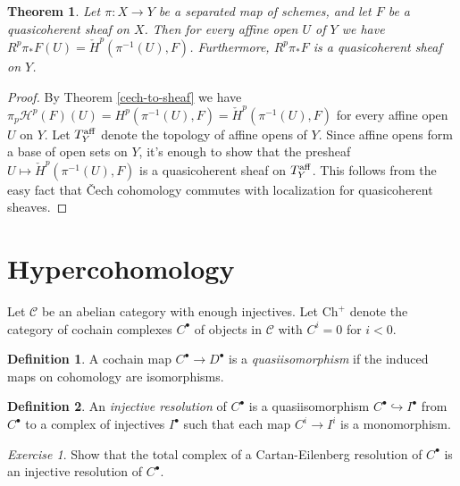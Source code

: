 \documentclass[letterpaper,11pt]{article}
\newtheorem{thm}{Theorem}
\theoremstyle{definition}
\newtheorem{defn}{Definition}
\theoremstyle{remark}
\newtheorem{exer}{Exercise}
\begin{document}
\begin{thm} Let $\pi:X\rightarrow Y$ be a separated map of schemes, and let $F$ be a quasicoherent sheaf on $X$. Then for every affine open $U$ of $Y$ we have $R^p\pi_*F(U) = \check{H}^p(\pi^{-1}(U),F)$. Furthermore, $R^p\pi_*F$ is a quasicoherent sheaf on $Y$.
\end{thm}
\begin{proof} By Theorem \ref{cech-to-sheaf} we have $\pi_p\mathcal{H}^p(F)(U) = H^p(\pi^{-1}(U),F) = \check{H}^p(\pi^{-1}(U),F)$ for every affine open $U$ on $Y$. Let $T_Y^{\rm aff}$ denote the topology of affine opens of $Y$. Since affine opens form a base of open sets on $Y$, it's enough to show that the presheaf $U\mapsto \check{H}^p(\pi^{-1}(U),F)$ is a quasicoherent sheaf on $T_Y^{\rm aff}$. This follows from the easy fact that \v{C}ech cohomology commutes with localization for quasicoherent sheaves.
\end{proof}

\section{Hypercohomology}

Let $\mathcal{C}$ be an abelian category with enough injectives. Let $\mbox{Ch}^+$ denote the category of cochain complexes $C^\bullet$ of objects in $\mathcal{C}$ with $C^i = 0$ for $i < 0$.

\begin{defn} A cochain map $C^\bullet \rightarrow D^\bullet$ is a \emph{quasiisomorphism} if the induced maps on cohomology are isomorphisms.
\end{defn}

\begin{defn} An \emph{injective resolution} of $C^\bullet$ is a quasiisomorphism $C^\bullet \hookrightarrow I^\bullet$ from $C^\bullet$ to a complex of injectives $I^\bullet$ such that each map $C^i \rightarrow I^i$ is a monomorphism.
\end{defn}

\begin{exer} Show that the total complex of a Cartan-Eilenberg resolution of $C^\bullet$ is an injective resolution of $C^\bullet$.
\end{exer}
\end{document}
